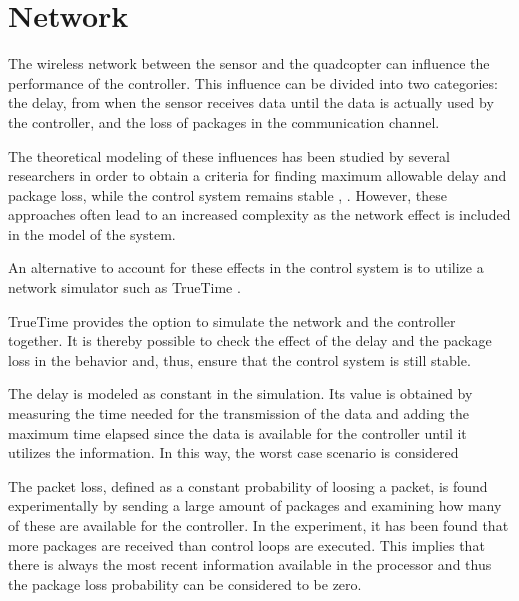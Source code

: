 \section{Network}\label{sec:network}
The wireless network between the sensor and the quadcopter can influence the performance of the controller. This influence can be divided into two categories: the delay, from when the sensor receives data until the data is actually used by the controller, and the loss of packages in the communication channel.


The theoretical modeling of these influences has been studied by several researchers in order to obtain a criteria for finding maximum allowable delay and package loss, while the control system remains stable  \cite{ling}, \cite{nirupam}. However, these approaches often lead to an increased complexity as the network effect is included in the model of the system.

An alternative to account for these effects in the control system is to utilize a network simulator such as TrueTime \cite{TrueTimeNew}.

TrueTime provides the option to simulate the network and the controller together. It is thereby possible to check the effect of the delay and the package loss in the behavior and, thus, ensure that the control system is still stable.

The delay is modeled as constant in the simulation. Its value is obtained by measuring the time needed for the transmission of the data and adding the maximum time elapsed since the data is available for the controller until it utilizes the information. In this way, the worst case scenario is considered

The packet loss, defined as a constant probability of loosing a packet, is found experimentally by sending a large amount of packages and examining how many of these are available for the controller. In the experiment, it has been found that more packages are received than control loops are executed. This implies that there is always the most recent information available in the processor and thus the package loss probability can be considered to be zero.
%
